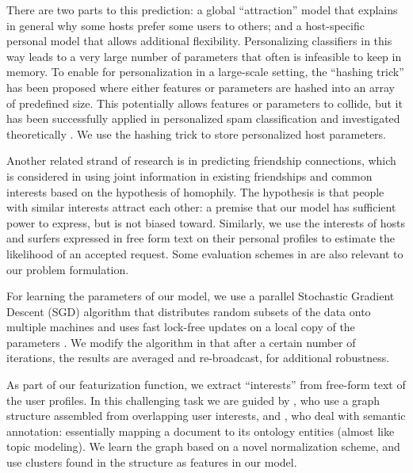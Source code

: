 There are two parts to this prediction: a global ``attraction'' model that explains in general why some hosts prefer some users to others; and a host-specific personal model that allows additional flexibility.
Personalizing classifiers in this way leads to a very large number of parameters that often is infeasible to keep in memory.
To enable for personalization in a large-scale setting, the ``hashing trick'' has been proposed where either features or parameters are hashed into an array of predefined size.
This potentially allows features or parameters to collide, but it has been successfully applied in personalized spam classification \cite{Attenberg2009} and investigated theoretically \cite{Weinberger2012}.
We use the hashing trick to store personalized host parameters.

Another related strand of research is in predicting friendship connections, which is considered in \cite{Yang2011} using joint information in existing friendships and common interests based on the hypothesis of homophily.
The hypothesis is that people with similar interests attract each other: a premise that our model has sufficient power to express, but is not biased toward.
Similarly, we use the interests of hosts and surfers expressed in free form text on their personal profiles to estimate the likelihood of an accepted request.
Some evaluation schemes in \cite{Yang2011} are also relevant to our problem formulation.

For learning the parameters of our model, we use a parallel Stochastic Gradient Descent (SGD) algorithm that distributes random subsets of the data onto multiple machines and uses fast lock-free updates on a local copy of the parameters \cite{Zinkevich2010}.
We modify the algorithm in that after a certain number of iterations, the results are averaged and re-broadcast, for additional robustness.

As part of our featurization function, we extract ``interests'' from free-form text of the user profiles.
In this challenging task we are guided by \cite{Liu2005}, who use a graph structure assembled from overlapping user interests, and \cite{Cantador2011}, who deal with semantic annotation: essentially mapping a document to its ontology entities (almost like topic modeling).
We learn the graph based on a novel normalization scheme, and use clusters found in the structure as features in our model.


